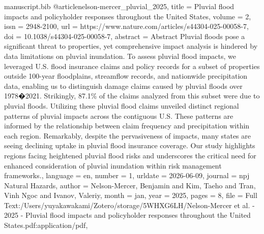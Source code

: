\begin{filecontents*}[force]{manuscript.bib}
@article{nelson-mercer_pluvial_2025,
	title = {Pluvial flood impacts and policyholder responses throughout the {United} {States}},
	volume = {2},
	issn = {2948-2100},
	url = {https://www.nature.com/articles/s44304-025-00058-7},
	doi = {10.1038/s44304-025-00058-7},
	abstract = {Abstract
            Pluvial floods pose a significant threat to properties, yet comprehensive impact analysis is hindered by data limitations on pluvial inundation. To assess pluvial flood impacts, we leveraged U.S. flood insurance claims and policy records for a subset of properties outside 100-year floodplains, streamflow records, and nationwide precipitation data, enabling us to distinguish damage claims caused by pluvial floods over 1978�2021. Strikingly, 87.1\% of the claims analyzed from this subset were due to pluvial floods. Utilizing these pluvial flood claims unveiled distinct regional patterns of pluvial impacts across the contiguous U.S. These patterns are informed by the relationship between claim frequency and precipitation within each region. Remarkably, despite the pervasiveness of impacts, many states are seeing declining uptake in pluvial flood insurance coverage. Our study highlights regions facing heightened pluvial flood risks and underscores the critical need for enhanced consideration of pluvial inundation within risk management frameworks.},
	language = {en},
	number = {1},
	urldate = {2026-06-09},
	journal = {npj Natural Hazards},
	author = {Nelson-Mercer, Benjamin and Kim, Taeho and Tran, Vinh Ngoc and Ivanov, Valeriy},
	month = jan,
	year = {2025},
	pages = {8},
	file = {Full Text:/Users/yuyakawakami/Zotero/storage/5WHXG6LH/Nelson-Mercer et al. - 2025 - Pluvial flood impacts and policyholder responses throughout the United States.pdf:application/pdf},
}


\end{filecontents*}
